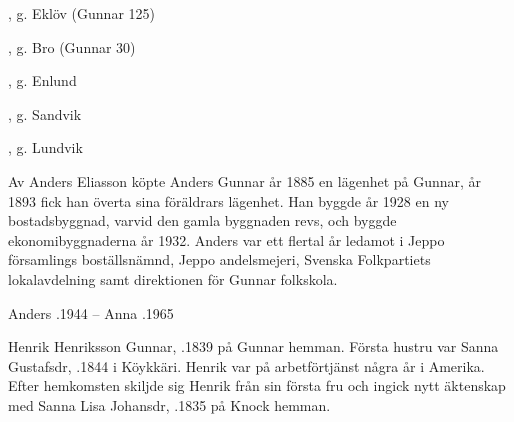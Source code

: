 \begin{jhchildren}
  \item {}
  \item {}
  \item {}, g. Eklöv (Gunnar 125)
  \item {}, g. Bro (Gunnar 30)
  \item {}, g. Enlund
  \item {}
  \item {}, g. Sandvik
  \item {}, g. Lundvik
  \item {}
  \item {}
  \item {}
\end{jhchildren}

Av Anders Eliasson köpte Anders Gunnar år 1885 en lägenhet på Gunnar, år 1893 fick han överta sina föräldrars lägenhet. Han byggde år 1928 en ny bostadsbyggnad, varvid den gamla byggnaden revs, och byggde ekonomibyggnaderna år 1932.					Anders var ett flertal år ledamot i Jeppo församlings boställsnämnd, Jeppo andelsmejeri, Svenska Folkpartiets lokalavdelning samt direktionen för Gunnar folkskola.

Anders .1944  --  Anna .1965


Henrik Henriksson Gunnar, .1839 på Gunnar hemman. Första hustru var Sanna Gustafsdr, .1844 i Köykkäri. Henrik var på arbetförtjänst några år i Amerika. Efter hemkomsten skiljde sig Henrik från sin första fru och ingick nytt äktenskap med Sanna Lisa Johansdr, .1835 på Knock hemman.

\begin{jhchildren}
  \item {}
  \item {}
  \item {}
  \item {}
  \item {}
\end{jhchildren}

